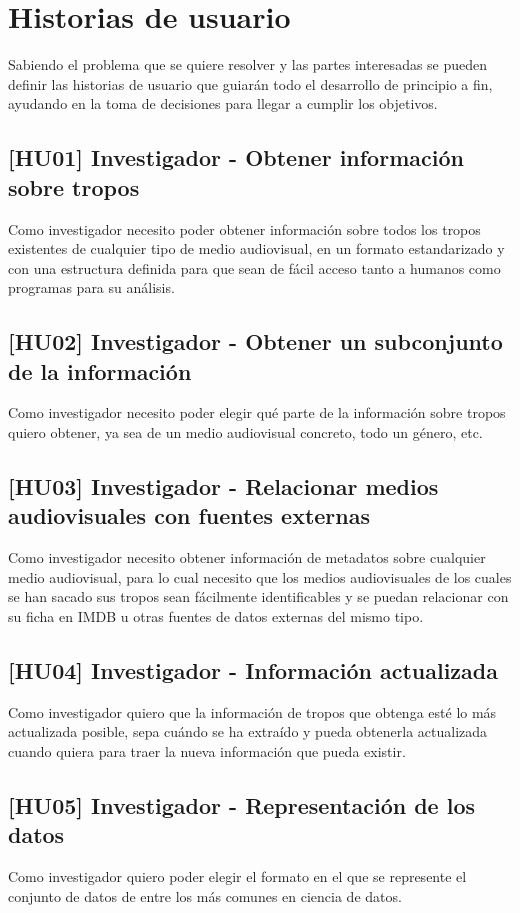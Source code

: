 \section{Historias de usuario}
Sabiendo el problema que se quiere resolver y las partes interesadas se pueden
definir las historias de usuario que guiarán todo el desarrollo de principio a
fin, ayudando en la toma de decisiones para llegar a cumplir los objetivos.

\subsection{[HU01] Investigador - Obtener información sobre tropos}
Como investigador necesito poder obtener información sobre todos los tropos
existentes de cualquier tipo de medio audiovisual, en un formato estandarizado y
con una estructura definida para que sean de fácil acceso tanto a humanos como
programas para su análisis.

\subsection{[HU02] Investigador - Obtener un subconjunto de la información}
Como investigador necesito poder elegir qué parte de la información sobre tropos
quiero obtener, ya sea de un medio audiovisual concreto, todo un género, etc.

\subsection{[HU03] Investigador - Relacionar medios audiovisuales con fuentes externas}
Como investigador necesito obtener información de metadatos sobre cualquier
medio audiovisual, para lo cual necesito que los medios audiovisuales de los
cuales se han sacado sus tropos sean fácilmente identificables y se puedan
relacionar con su ficha en IMDB u otras fuentes de datos externas del mismo
tipo.

\subsection{[HU04] Investigador - Información actualizada}
Como investigador quiero que la información de tropos que obtenga esté lo más
actualizada posible, sepa cuándo se ha extraído y pueda obtenerla actualizada
cuando quiera para traer la nueva información que pueda existir.

\subsection{[HU05] Investigador - Representación de los datos}
Como investigador quiero poder elegir el formato en el que se represente el
conjunto de datos de entre los más comunes en ciencia de datos.

